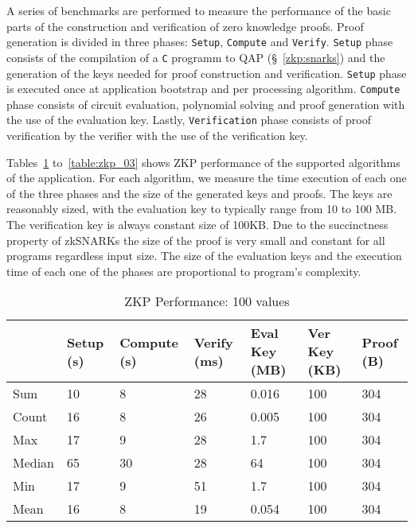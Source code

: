 A series of benchmarks are performed to measure the performance of the basic parts of the construction and verification of zero knowledge proofs. Proof generation is divided in three phases: \verb|Setup|, \verb|Compute| and \verb|Verify|. \verb|Setup| phase consists of the compilation of a \verb|C| programm to QAP (§~\ref{zkp:snarks}) and the generation of the keys needed for proof construction and verification. \verb|Setup| phase is executed once at application bootstrap and per processing algorithm. \verb|Compute| phase consists of circuit evaluation, polynomial solving and proof generation with the use of the evaluation key. Lastly, \verb|Verification| phase consists of proof verification by the verifier with the use of the verification key.

Tables~\ref{table:zkp_01} to~\ref{table:zkp_03} shows ZKP performance of the supported algorithms of the application. For each algorithm, we measure the time execution of each one of the three phases and the size of the generated keys and proofs. The keys are reasonably sized, with the evaluation key to typically range from 10 to 100 MB. The verification key is always constant size of 100KB. Due to the succinctness property of zkSNARKs the size of the proof is very small and constant for all programs regardless input size. The size of the evaluation keys and the execution time of each one of the phases are proportional to program's complexity.

\begin{table}[!htb]
\small
\centering
\captionsetup{format=hang, justification=centering}
\caption{ZKP Performance: 100 values}
\begin{tabular}{|l|l|l|l|l|l|l|}
\hline
 & Setup (s) & Compute (s) & Verify (ms) & Eval Key (MB) & Ver Key (KB) & Proof (B)  \\ \hline
 Sum & 10 & 8 & 28 & 0.016 & 100 & 304 \\ \hline
 Count & 16 & 8 & 26 & 0.005 & 100 & 304 \\ \hline
 Max & 17 & 9 & 28 & 1.7 & 100 & 304 \\ \hline
 Median & 65 & 30 & 28 & 64 & 100 & 304 \\ \hline
 Min & 17 & 9 & 51 & 1.7 & 100 & 304 \\ \hline
 Mean & 16 & 8 & 19 & 0.054 & 100 & 304 \\ \hline
\end{tabular}
\label{table:zkp_01}
\end{table}

